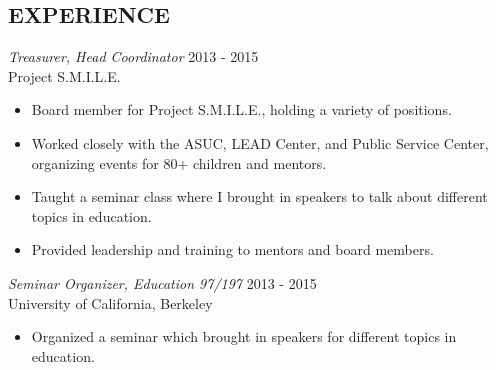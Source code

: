 \documentclass[margin, 8pt]{res} %
\begin{document}
\begin{resume}
\section{EXPERIENCE}
{\sl Treasurer, Head Coordinator} \hfill            2013 - 2015\\
                Project S.M.I.L.E.
                 \begin{itemize}  \itemsep -2pt %
                 \item Board member for Project S.M.I.L.E., holding a variety of positions.
                \item Worked closely with the ASUC, LEAD Center, and Public Service Center, organizing events for 80+ children and mentors.
		\item Taught a seminar class where I brought in speakers to talk about different topics in education.
		\item Provided leadership and training to mentors and board members.
                 \end{itemize}
{\sl Seminar Organizer, Education 97/197} \hfill                       2013 - 2015\\
                University of California, Berkeley
                \begin{itemize} \itemsep -2pt
                \item Organized a seminar which brought in speakers for different topics in education.
                \end{itemize}





\end{resume}
\end{document}
